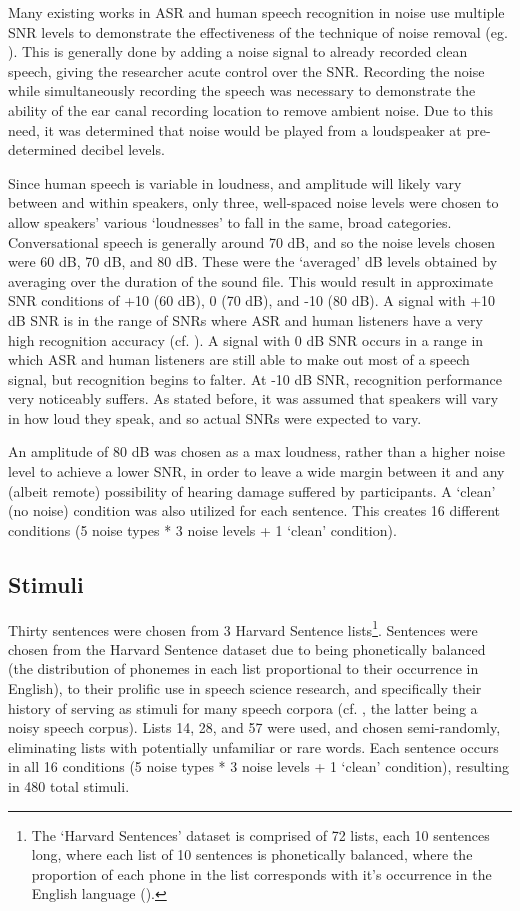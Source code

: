 Many existing works in ASR and human speech recognition in noise use multiple SNR levels to demonstrate the effectiveness of the technique of noise removal (eg. \cite{braun:16}).  This is generally done by adding a noise signal to already recorded clean speech, giving the researcher acute control over the SNR.  Recording the noise while simultaneously recording the speech was necessary to demonstrate the ability of the ear canal recording location to remove ambient noise.  Due to this need, it was determined that noise would be played from a loudspeaker at pre-determined decibel levels.  

Since human speech is variable in loudness, and amplitude will likely vary between and within speakers, only three, well-spaced noise levels were chosen to allow speakers' various `loudnesses' to fall in the same, broad categories.  Conversational speech is generally around 70 dB, and so the noise levels chosen were 60 dB, 70 dB, and 80 dB.  These were the `averaged' dB levels obtained by averaging over the duration of the sound file.  This would result in approximate SNR conditions of +10 (60 dB), 0 (70 dB), and -10 (80 dB).  A signal with +10 dB SNR is in the range of SNRs where ASR and human listeners have a very high recognition accuracy (cf. \cite{braun:16,gilbert:13}).  A signal with 0 dB SNR occurs in a range in which ASR and human listeners are still able to make out most of a speech signal, but recognition begins to falter.  At -10 dB SNR, recognition performance very noticeably suffers.  As stated before, it was assumed that speakers will vary in how loud they speak, and so actual SNRs were expected to vary.

An amplitude of 80 dB was chosen as a max loudness, rather than a higher noise level to achieve a lower SNR, in order to leave a wide margin between it and any (albeit remote) possibility of hearing damage suffered by participants.  A `clean' (no noise) condition was also utilized for each sentence.  This creates 16 different conditions (5 noise types * 3 noise levels + 1 `clean' condition).  

\subsection{Stimuli}
Thirty sentences were chosen from 3 Harvard Sentence lists\footnote{The `Harvard Sentences' dataset is comprised of 72 lists, each 10 sentences long, where each list of 10 sentences is phonetically balanced, where the proportion of each phone in the list corresponds with it's occurrence in the English language (\cite{harvardSents}).}.  Sentences were chosen from the Harvard Sentence dataset due to being phonetically balanced (the distribution of phonemes in each list proportional to their occurrence in English), to their prolific use in speech science research, and specifically their history of serving as stimuli for many speech corpora (cf. \cite{kabal:02,hu:07}, the latter being a noisy speech corpus).  Lists 14, 28, and 57 were used, and chosen semi-randomly, eliminating lists with potentially unfamiliar or rare words.  Each sentence occurs in all 16 conditions (5 noise types * 3 noise levels + 1 `clean' condition), resulting in 480 total stimuli.

